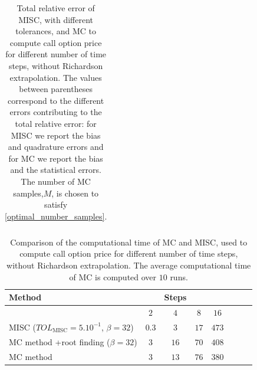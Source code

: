 \begin{table}[h!]
\begin{tabular}{l*{6}{c}r}
			\bottomrule[1.25pt]
	\end{tabular}
	\caption{Total relative  error of MISC, with different tolerances, and MC to compute call option price for different number of time steps, without Richardson extrapolation. The values between parentheses correspond to the different errors contributing to the total relative error: for MISC we report the bias and quadrature errors and for MC we report the bias and the statistical errors. The number of MC samples,$ M$, is chosen to satisfy \eqref{optimal_number_samples}.}
	\label{Total error of MISC and MC to compute Call option price of the different tolerances for different number of time steps, without Richardson extrapolation. The numbers between parentheses are the corresponding absolute errors.}
\end{table}

\FloatBarrier




\begin{table}[h!]
	\centering
	\begin{tabular}{l*{6}{c}r}
		\toprule[1.5pt]
	Method & & Steps  & &     \\
	\hline
	         & $2$ & $4$ & $8$ & $16$ &   \\
		\hline
		MISC ($TOL_{\text{MISC}}=5.10^{-1}$, $\beta=32$) & $0.3$ & $3$ & $17$ & $473$  \\
			MC method +root finding ($\beta=32$)  & $3$ & $16$ & $70$ & $408$  \\
				MC method & $3$ & $13$ & $76$ & $380$  \\
%		
		\bottomrule[1.25pt]
	\end{tabular}
	\caption{Comparison of the computational time of  MC and MISC, used to compute call option price  for different number of time steps, without Richardson extrapolation. The average computational time of MC is computed over $10$ runs.}
	\label{Comparsion of the computational time of  MC and MISC, used to compute Call option price  for different number of time steps, without Richardson extrapolation}
\end{table}



